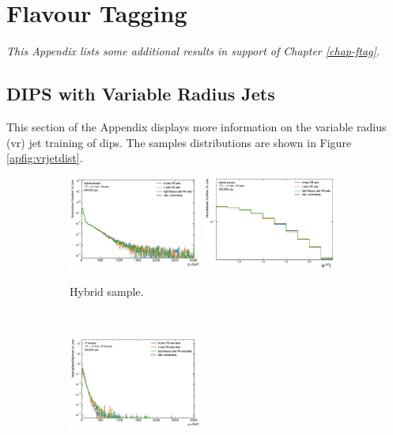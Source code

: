 \chapter{Flavour Tagging}
\textit{This Appendix lists some additional results in support of Chapter \ref{chap-ftag}.}

\section{DIPS with Variable Radius Jets}\label{ap-DIPSVR}
This section of the Appendix displays more information on the variable radius (\gls{vr}) jet training of \gls{dips}. The samples distributions are shown in Figure \ref{apfig:vrjetdist}.

\begin{figure}[h!]
  \centering
  \begin{subfigure}[b]{0.98\textwidth}
      \centering
      \includegraphics[width=0.48\textwidth]{Images/FTAG/VRDips/JetDist/hspt.png}
      \includegraphics[width=0.48\textwidth]{Images/FTAG/VRDips/JetDist/hseta.png}
      \caption{Hybrid sample.} 
      \label{apfig:vrjetdisth}
  \end{subfigure}\\
  \begin{subfigure}[b]{0.98\textwidth}
      \centering
      \includegraphics[width=0.48\textwidth]{Images/FTAG/VRDips/JetDist/ttpt.png}

\end{subfigure}
\end{figure}
